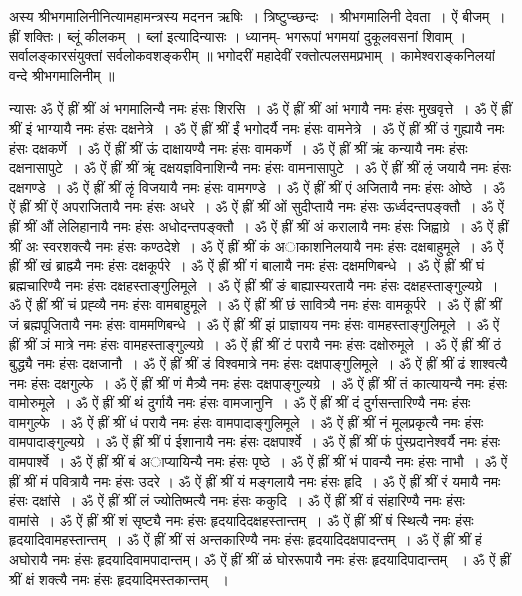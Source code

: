 अस्य श्रीभगमालिनीनित्यामहामन्त्रस्य मदनन ऋषिः~। त्रिष्टुप्च्छन्दः~। श्रीभगमालिनी देवता~। ऐं बीजम्~। ह्रीं शक्तिः। ब्लूं कीलकम्~।
ब्लां इत्यादिन्यासः । ध्यानम्-
भगरूपां भगमयां दुकूलवसनां शिवाम् ।
सर्वालङ्कारसंयुक्तां सर्वलोकवशङ्करीम् ॥
भगोदरीं महादेवीं रक्तोत्पलसमप्रभाम् ।
कामेश्वराङ्कनिलयां वन्दे श्रीभगमालिनीम् ॥

न्यासः
ॐ ऐं ह्रीं श्रीं अं भगमालिन्यै नमः हंसः शिरसि~। 
ॐ ऐं ह्रीं श्रीं आं भगायै नमः हंसः मुखवृत्ते~। 
ॐ ऐं ह्रीं श्रीं इं भाग्यायै नमः हंसः दक्षनेत्रे~। 
ॐ ऐं ह्रीं श्रीं ईं भगोदर्यै नमः हंसः वामनेत्रे~। 
ॐ ऐं ह्रीं श्रीं उं गुह्यायै नमः हंसः दक्षकर्णे~। 
ॐ ऐं ह्रीं श्रीं ऊं दाक्षायण्यै नमः हंसः वामकर्णे~। 
ॐ ऐं ह्रीं श्रीं ऋं कन्यायै नमः हंसः दक्षनासापुटे~। 
ॐ ऐं ह्रीं श्रीं ॠं दक्षयज्ञविनाशिन्यै नमः हंसः वामनासापुटे~। 
ॐ ऐं ह्रीं श्रीं ऌं जयायै नमः हंसः दक्षगण्डे~। 
ॐ ऐं ह्रीं श्रीं ऌृं विजयायै नमः हंसः वामगण्डे~। 
ॐ ऐं ह्रीं श्रीं एं अजितायै नमः हंसः ओष्ठे~। 
ॐ ऐं ह्रीं श्रीं ऐं अपराजितायै नमः हंसः अधरे~। 
ॐ ऐं ह्रीं श्रीं ओं सुदीप्तायै नमः हंसः ऊर्ध्वदन्तपङ्क्तौ~। 
ॐ ऐं ह्रीं श्रीं औं लेलिहानायै नमः हंसः अधोदन्तपङ्क्तौ~। 
ॐ ऐं ह्रीं श्रीं अं करालायै नमः हंसः जिह्वाग्रे~। 
ॐ ऐं ह्रीं श्रीं अः स्वरशक्त्यै नमः हंसः कण्ठदेशे~। 
ॐ ऐं ह्रीं श्रीं कं अाकाशनिलयायै नमः हंसः दक्षबाहुमूले~। 
ॐ ऐं ह्रीं श्रीं खं ब्राह्म्यै नमः हंसः दक्षकूर्परे~। 
ॐ ऐं ह्रीं श्रीं गं बालायै नमः हंसः दक्षमणिबन्धे~। 
ॐ ऐं ह्रीं श्रीं घं ब्रह्मचारिण्यै नमः हंसः दक्षहस्ताङ्गुलिमूले~। 
ॐ ऐं ह्रीं श्रीं ङं बाह्यास्यरतायै नमः हंसः दक्षहस्ताङ्गुल्यग्रे~। 
ॐ ऐं ह्रीं श्रीं चं प्रह्व्यै नमः हंसः वामबाहुमूले~। 
ॐ ऐं ह्रीं श्रीं छं सावित्र्यै नमः हंसः वामकूर्परे~। 
ॐ ऐं ह्रीं श्रीं जं ब्रह्मपूजितायै नमः हंसः वाममणिबन्धे~। 
ॐ ऐं ह्रीं श्रीं झं प्राज्ञायय नमः हंसः वामहस्ताङ्गुलिमूले~। 
ॐ ऐं ह्रीं श्रीं ञं मात्रे नमः हंसः वामहस्ताङ्गुल्यग्रे~। 
ॐ ऐं ह्रीं श्रीं टं परायै नमः हंसः दक्षोरुमूले~। 
ॐ ऐं ह्रीं श्रीं ठं बुद्ध्यै नमः हंसः दक्षजानौ~। 
ॐ ऐं ह्रीं श्रीं डं विश्वमात्रे नमः हंसः दक्षपाङ्गुलिमूले~। 
ॐ ऐं ह्रीं श्रीं ढं शाश्वत्यै नमः हंसः दक्षगुल्फे~। 
ॐ ऐं ह्रीं श्रीं णं मैत्र्यै नमः हंसः दक्षपाङ्गुल्यग्रे~। 
ॐ ऐं ह्रीं श्रीं तं कात्यायन्यै नमः हंसः वामोरुमूले~।
ॐ ऐं ह्रीं श्रीं थं दुर्गायै नमः हंसः वामजानुनि~। 
ॐ ऐं ह्रीं श्रीं दं दुर्गसन्तारिण्यै नमः हंसः वामगुल्फे~। 
ॐ ऐं ह्रीं श्रीं धं परायै नमः हंसः वामपादाङ्गुलिमूले~। 
ॐ ऐं ह्रीं श्रीं नं मूलप्रकृत्यै नमः हंसः वामपादाङ्गुल्यग्रे~। 
ॐ ऐं ह्रीं श्रीं पं ईशानायै नमः हंसः दक्षपार्श्वे~। 
ॐ ऐं ह्रीं श्रीं फं पुंस्प्रदानेश्वर्यै नमः हंसः वामपार्श्वे~।
ॐ ऐं ह्रीं श्रीं बं अाप्यायिन्यै नमः हंसः पृष्ठे~।
ॐ ऐं ह्रीं श्रीं भं पावन्यै नमः हंसः नाभौ~। 
ॐ ऐं ह्रीं श्रीं मं पवित्रायै नमः हंसः उदरे ।
ॐ ऐं ह्रीं श्रीं यं मङ्गलायै नमः हंसः हृदि~। 
ॐ ऐं ह्रीं श्रीं रं यमायै नमः हंसः दक्षांसे~। 
ॐ ऐं ह्रीं श्रीं लं ज्योतिष्मत्यै नमः हंसः ककुदि~। 
ॐ ऐं ह्रीं श्रीं वं संहारिण्यै नमः हंसः वामांसे~। 
ॐ ऐं ह्रीं श्रीं शं सृष्ट्यै नमः हंसः हृदयादिदक्षहस्तान्तम्~।
ॐ ऐं ह्रीं श्रीं षं स्थित्यै नमः हंसः हृदयादिवामहस्तान्तम्~। 
ॐ ऐं ह्रीं श्रीं सं अन्तकारिण्यै नमः हंसः हृदयादिदक्षपादन्तम्~। 
ॐ ऐं ह्रीं श्रीं हं अघोरायै नमः हंसः हृदयादिवामपादान्तम्। 
ॐ ऐं ह्रीं श्रीं ळं घोररूपायै नमः हंसः हृदयादिपादान्तम् ~। 
ॐ ऐं ह्रीं श्रीं क्षं शक्त्यै नमः हंसः हृदयादिमस्तकान्तम् ~।

